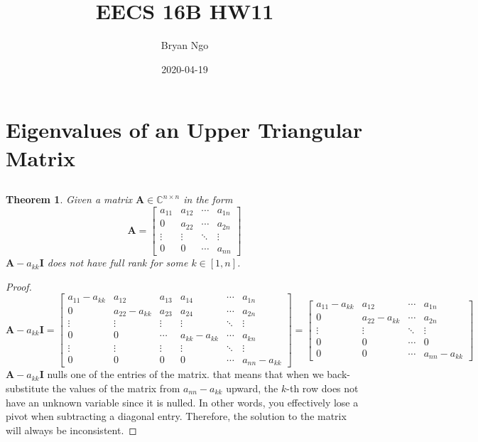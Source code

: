 \documentclass[]{article}
\title{EECS 16B HW11}
\author{Bryan Ngo}
\date{2020-04-19}
\newtheorem{genthm}{Theorem}
\begin{document}
\maketitle

\section{Eigenvalues of an Upper Triangular Matrix}

\subsection{}

\begin{genthm}
Given a matrix \(\bm{A} \in \mathbb{C}^{n \times n}\) in the form
\begin{equation}
	\bm{A} =
	\begin{bmatrix}
	a_{11} & a_{12} & \cdots & a_{1n} \\
	0 & a_{22} & \cdots & a_{2n} \\
	\vdots & \vdots & \ddots & \vdots \\
	0 & 0 & \cdots & a_{nn}
	\end{bmatrix}
\end{equation}
\(\bm{A} - a_{kk} \bm{I}\) does not have full rank for some \(k \in [1, n]\).
\end{genthm}

\begin{proof}
\begin{equation}
	\bm{A} - a_{kk} \bm{I} =
	\begin{bmatrix}
	a_{11} - a_{kk} & a_{12} & a_{13} & a_{14} & \cdots & a_{1n} \\
	0 & a_{22} - a_{kk} & a_{23} & a_{24} & \cdots & a_{2n} \\
	\vdots & \vdots & \vdots & \vdots & \ddots & \vdots \\
	0 & 0 & \cdots & a_{kk} - a_{kk} & \cdots & a_{kn} \\
	\vdots & \vdots & \vdots & \vdots & \ddots & \vdots \\
	0 & 0 & 0 & 0 & \cdots & a_{nn} - a_{kk}
	\end{bmatrix} =
	\begin{bmatrix}
	a_{11} - a_{kk} & a_{12} & \cdots & a_{1n} \\
	0 & a_{22} - a_{kk} & \cdots & a_{2n} \\
	\vdots & \vdots & \ddots & \vdots \\
	0 & 0 & \cdots & 0 \\
	0 & 0 & \cdots & a_{nn} - a_{kk}
	\end{bmatrix}
\end{equation}
\(\bm{A} - a_{kk} \bm{I}\) nulls one of the entries of the matrix.
that means that when we back-substitute the values of the matrix from \(a_{nn} - a_{kk}\) upward, the \(k\)-th row does not have an unknown variable since it is nulled.
In other words, you effectively lose a pivot when subtracting a diagonal entry.
Therefore, the solution to the matrix will always be inconsistent.
\end{proof}
\end{document}
